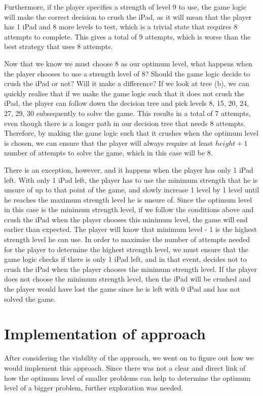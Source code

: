 \documentclass[12pt,a4paper,oneside]{report}
\begin{document}
Furthermore, if the player specifies a strength of level 9 to use, the game logic will make the correct decision to crush the iPad, as it will mean that the player has 1 iPad and 8 more levels to test, which is a trivial state that requires 8 attempts to complete. This gives a total of 9 attempts, which is worse than the best strategy that uses 8 attempts.

Now that we know we must choose 8 as our optimum level, what happens when the player chooses to use a strength level of 8? Should the game logic decide to crush the iPad or not? Will it make a difference? If we look at tree (b), we can quickly realise that if we make the game logic such that it does not crush the iPad, the player can follow down the decision tree and pick levels {8, 15, 20, 24, 27, 29, 30} subsequently to solve the game. This results in a total of 7 attempts, even though there is a longer path in our decision tree that needs 8 attempts. Therefore, by making the game logic such that it crushes when the optimum level is chosen, we can ensure that the player will always require at least $height + 1$ number of attempts to solve the game, which in this case will be 8.

There is an exception, however, and it happens when the player has only 1 iPad left. With only 1 iPad left, the player has to use the minimum strength that he is unsure of up to that point of the game, and slowly increase 1 level by 1 level until he reaches the maximum strength level he is unsure of. Since the optimum level in this case is the minimum strength level, if we follow the conditions above and crush the iPad when the player chooses this minimum level, the game will end earlier than expected. The player will know that minimum level - 1 is the highest strength level he can use. In order to maximise the number of attempts needed for the player to determine the highest strength level, we must ensure that the game logic checks if there is only 1 iPad left, and in that event, decides not to crush the iPad when the player chooses the minimum strength level. If the player does not choose the minimum strength level, then the iPad will be crushed and the player would have lost the game since he is left with 0 iPad and has not solved the game.

\section{Implementation of approach}
After considering the viability of the approach, we went on to figure out how we would implement this approach. Since there was not a clear and direct link of how the optimum level of smaller problems can help to determine the optimum level of a bigger problem, further exploration was needed. 
\end{document}
